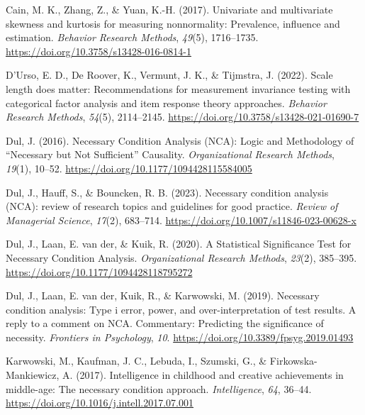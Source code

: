 \documentclass[
  man,
  longtable,
  nolmodern,
  notxfonts,
  notimes,
  colorlinks=true,linkcolor=blue,citecolor=blue,urlcolor=blue]{apa7}
\newlength{\cslhangindent}
\newenvironment{CSLReferences}[2] %
 {\begin{list}{}{%
  \setlength{\itemindent}{0pt}
  \setlength{\leftmargin}{0pt}
  \setlength{\parsep}{0pt}
  \ifodd #1
   \setlength{\leftmargin}{\cslhangindent}
   \setlength{\itemindent}{-1\cslhangindent}
  \fi
  \setlength{\itemsep}{#2\baselineskip}}}
 {\end{list}}
\begin{document}
\label{refs}
\begin{CSLReferences}{1}{0}
Cain, M. K., Zhang, Z., \& Yuan, K.-H. (2017). Univariate and
multivariate skewness and kurtosis for measuring nonnormality:
Prevalence, influence and estimation. \emph{Behavior Research Methods},
\emph{49}(5), 1716--1735.
\url{https://doi.org/10.3758/s13428-016-0814-1}

D'Urso, E. D., De Roover, K., Vermunt, J. K., \& Tijmstra, J. (2022).
Scale length does matter: Recommendations for measurement invariance
testing with categorical factor analysis and item response theory
approaches. \emph{Behavior Research Methods}, \emph{54}(5), 2114--2145.
\url{https://doi.org/10.3758/s13428-021-01690-7}

Dul, J. (2016). Necessary Condition Analysis (NCA): Logic and
Methodology of {``}Necessary but Not Sufficient{''} Causality.
\emph{Organizational Research Methods}, \emph{19}(1), 10--52.
\url{https://doi.org/10.1177/1094428115584005}

Dul, J., Hauff, S., \& Bouncken, R. B. (2023). Necessary condition
analysis (NCA): review of research topics and guidelines for good
practice. \emph{Review of Managerial Science}, \emph{17}(2), 683--714.
\url{https://doi.org/10.1007/s11846-023-00628-x}

Dul, J., Laan, E. van der, \& Kuik, R. (2020). A Statistical
Significance Test for Necessary Condition Analysis. \emph{Organizational
Research Methods}, \emph{23}(2), 385--395.
\url{https://doi.org/10.1177/1094428118795272}

Dul, J., Laan, E. van der, Kuik, R., \& Karwowski, M. (2019). Necessary
condition analysis: Type i error, power, and over-interpretation of test
results. A reply to a comment on NCA. Commentary: Predicting the
significance of necessity. \emph{Frontiers in Psychology}, \emph{10}.
\url{https://doi.org/10.3389/fpsyg.2019.01493}

Karwowski, M., Kaufman, J. C., Lebuda, I., Szumski, G., \&
Firkowska-Mankiewicz, A. (2017). Intelligence in childhood and creative
achievements in middle-age: The necessary condition approach.
\emph{Intelligence}, \emph{64}, 36--44.
\url{https://doi.org/10.1016/j.intell.2017.07.001}


\end{CSLReferences}
\end{document}
